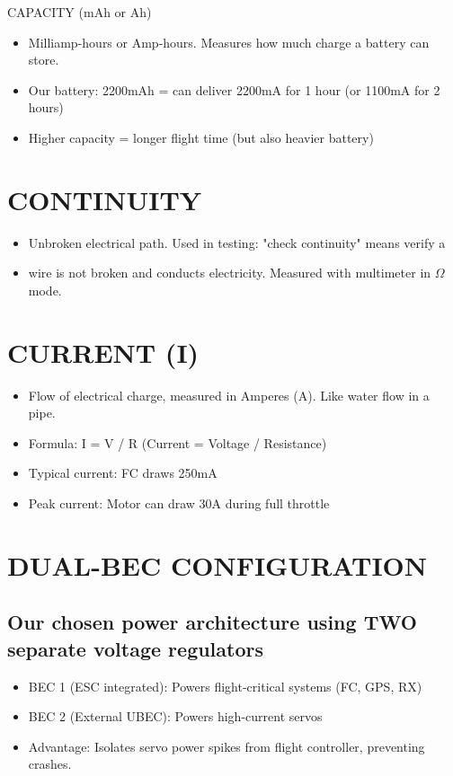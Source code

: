 \documentclass[11pt,letterpaper]{article}
\begin{document}
CAPACITY (mAh or Ah)\par

\begin{itemize}
  \item Milliamp-hours or Amp-hours. Measures how much charge a battery can store.
  \item Our battery: 2200mAh = can deliver 2200mA for 1 hour (or 1100mA for 2 hours)
  \item Higher capacity = longer flight time (but also heavier battery)
\end{itemize}

\section{CONTINUITY}

\begin{itemize}
  \item Unbroken electrical path. Used in testing: "check continuity" means verify a
  \item wire is not broken and conducts electricity. Measured with multimeter in $\Omega$ mode.
\end{itemize}

\section{CURRENT (I)}

\begin{itemize}
  \item Flow of electrical charge, measured in Amperes (A). Like water flow in a pipe.
  \item Formula: I = V / R (Current = Voltage / Resistance)
  \item Typical current: FC draws 250mA
  \item Peak current: Motor can draw 30A during full throttle
\end{itemize}

\section{DUAL-BEC CONFIGURATION}

\subsection{Our chosen power architecture using TWO separate voltage regulators}

\begin{itemize}
  \item BEC 1 (ESC integrated): Powers flight-critical systems (FC, GPS, RX)
  \item BEC 2 (External UBEC): Powers high-current servos
  \item Advantage: Isolates servo power spikes from flight controller, preventing crashes.
\end{itemize}
\end{document}
